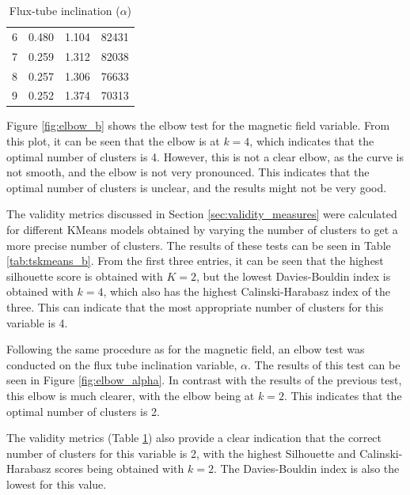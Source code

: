 \begin{table}[]
\begin{subtable}[h]{0.48\textwidth}
\begin{tabular}{@{}cccc@{}}
            6          & 0.480               & 1.104                   & 82431                  \\
            7          & 0.259               & 1.312                   & 82038                  \\
            8          & 0.257               & 1.306                   & 76633                  \\
            9          & 0.252               & 1.374                   & 70313                  \\ \bottomrule
            \end{tabular}
        \caption{Flux-tube inclination ($\alpha$)}
        \label{tab:tskmeans_alpha}
    \end{subtable}
\end{table}


Figure \ref{fig:elbow_b} shows the elbow test for the magnetic field variable. From this plot, it can be seen that the elbow is at $k=4$, which indicates that the optimal number of clusters is 4. However, this is not a clear elbow, as the curve is not smooth, and the elbow is not very pronounced. This indicates that the optimal number of clusters is unclear, and the results might not be very good.

The validity metrics discussed in Section \ref{sec:validity_measures} were calculated for different KMeans models obtained by varying the number of clusters to get a more precise number of clusters. The results of these tests can be seen in Table \ref{tab:tskmeans_b}. From the first three entries, it can be seen that the highest silhouette score is obtained with $K=2$, but the lowest Davies-Bouldin index is obtained with $k=4$, which also has the highest Calinski-Harabasz index of the three. This can indicate that the most appropriate number of clusters for this variable is 4.

Following the same procedure as for the magnetic field, an elbow test was conducted on the flux tube inclination variable, $\alpha$. The results of this test can be seen in Figure \ref{fig:elbow_alpha}. In contrast with the results of the previous test, this elbow is much clearer, with the elbow being at $k=2$. This indicates that the optimal number of clusters is 2.

The validity metrics (Table \ref{tab:tskmeans_alpha}) also provide a clear indication that the correct number of clusters for this variable is 2, with the highest Silhouette and Calinski-Harabasz scores being obtained with $k=2$. The Davies-Bouldin index is also the lowest for this value.


